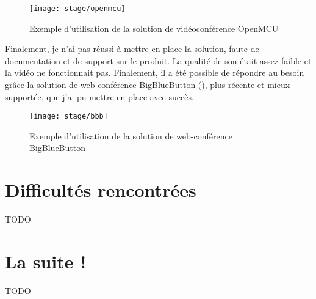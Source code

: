 \begin{figure}
	\centering
	\texttt{[image: stage/openmcu]}
	\caption{Exemple d'utilisation de la solution de vidéoconférence OpenMCU}
	\label{figure:stage:openmcu}
\end{figure}

Finalement, je n'ai pas réussi à mettre en place la solution, faute de documentation et de support sur le produit.
La qualité de son était assez faible et la vidéo ne fonctionnait pas.
Finalement, il a été possible de répondre au besoin grâce la solution de web-conférence BigBlueButton (), plus récente et mieux supportée, que j'ai pu mettre en place avec succès.

\begin{figure}
	\centering
	\texttt{[image: stage/bbb]}
	\caption{Exemple d'utilisation de la solution de web-conférence BigBlueButton}
	\label{figure:stage:bbb}
\end{figure}



\section{Difficultés rencontrées}

TODO



\section{La suite !}

TODO

